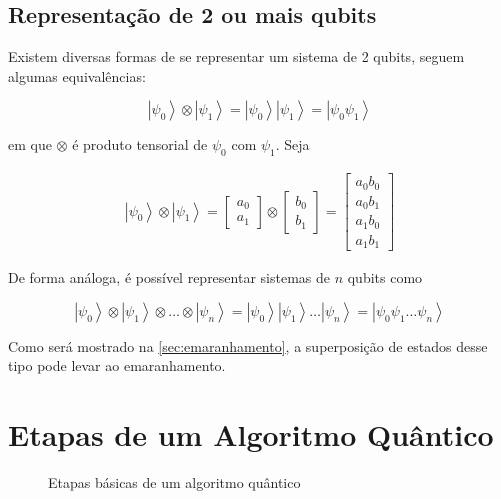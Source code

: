 \subsection{Representação de 2 ou mais qubits}\label{subsec:repr}

Existem diversas formas de se representar um sistema de 2 qubits, seguem
algumas equivalências:

\[\left| \psi_0 \right\rangle \otimes \left| \psi_1 \right\rangle = \left| \psi_0 \right\rangle \left| \psi_1 \right\rangle = \left| \psi_0 \psi_1 \right\rangle\]

em que \(\otimes\) é produto tensorial de \(\psi_0\) com \(\psi_1\).
Seja

\[\begin{aligned}
\left| \psi_0 \right\rangle \otimes \left| \psi_1 \right\rangle
= \begin{bmatrix} a_0 \\ a_1 \end{bmatrix} \otimes \begin{bmatrix} b_0 \\ b_1 \end{bmatrix}
= \begin{bmatrix} a_0 b_0 \\ a_0 b_1 \\ a_1 b_0 \\ a_1 b_1 \end{bmatrix}
\end{aligned}\]

De forma análoga, é possível representar sistemas de \(n\) qubits como

\[\left| \psi_0 \right\rangle \otimes \left| \psi_1 \right\rangle \otimes \dots \otimes \left| \psi_n \right\rangle
= \left| \psi_0 \right\rangle \left| \psi_1 \right\rangle \dots \left| \psi_n \right\rangle
= \left| \psi_0 \psi_1 \dots \psi_n \right\rangle\]

Como será mostrado na \autoref{sec:emaranhamento}, a superposição de estados desse tipo pode levar ao emaranhamento.

\section{Etapas de um Algoritmo Quântico}\label{sec:etapas-quanticas}

\begin{figure}[!htp]
    \centering
    
    \caption{Etapas básicas de um algoritmo quântico}
    \label{fig:etapas-alg}
\end{figure}

